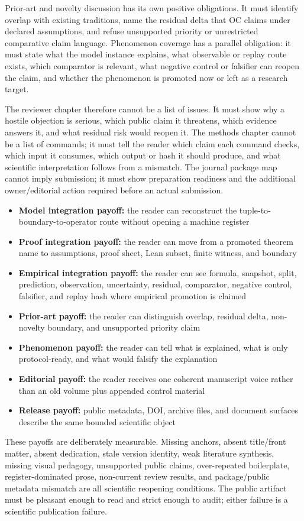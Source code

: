 Prior-art and novelty discussion has its own positive obligations. It must identify overlap with existing traditions, name the residual delta that OC claims under declared assumptions, and refuse unsupported priority or unrestricted comparative claim language. Phenomenon coverage has a parallel obligation: it must state what the model instance explains, what observable or replay route exists, which comparator is relevant, what negative control or falsifier can reopen the claim, and whether the phenomenon is promoted now or left as a research target.

The reviewer chapter therefore cannot be a list of issues. It must show why a hostile objection is serious, which public claim it threatens, which evidence answers it, and what residual risk would reopen it. The methods chapter cannot be a list of commands; it must tell the reader which claim each command checks, which input it consumes, which output or hash it should produce, and what scientific interpretation follows from a mismatch. The journal package map cannot imply submission; it must show preparation readiness and the additional owner/editorial action required before an actual submission.

\begin{itemize}[leftmargin=1.8em]
\item \textbf{Model integration payoff:} the reader can reconstruct the tuple-to-boundary-to-operator route without opening a machine register
\item \textbf{Proof integration payoff:} the reader can move from a promoted theorem name to assumptions, proof sheet, Lean subset, finite witness, and boundary
\item \textbf{Empirical integration payoff:} the reader can see formula, snapshot, split, prediction, observation, uncertainty, residual, comparator, negative control, falsifier, and replay hash where empirical promotion is claimed
\item \textbf{Prior-art payoff:} the reader can distinguish overlap, residual delta, non-novelty boundary, and unsupported priority claim
\item \textbf{Phenomenon payoff:} the reader can tell what is explained, what is only protocol-ready, and what would falsify the explanation
\item \textbf{Editorial payoff:} the reader receives one coherent manuscript voice rather than an old volume plus appended control material
\item \textbf{Release payoff:} public metadata, DOI, archive files, and document surfaces describe the same bounded scientific object
\end{itemize}
These payoffs are deliberately measurable. Missing anchors, absent title/front matter, absent dedication, stale version identity, weak literature synthesis, missing visual pedagogy, unsupported public claims, over-repeated boilerplate, register-dominated prose, non-current review results, and package/public metadata mismatch are all scientific reopening conditions. The public artifact must be pleasant enough to read and strict enough to audit; either failure is a scientific publication failure.


